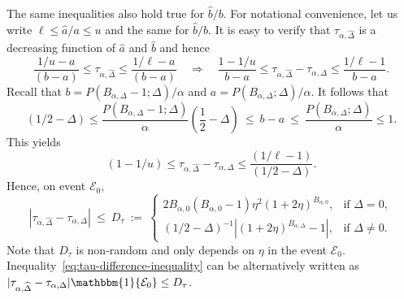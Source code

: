 \documentclass{article}
\numberwithin{myalgctr}{section}
\begin{document}
The same inequalities also hold true for $\widehat{b}/b$. For notational convenience, let us write $\ell \le \widehat{a}/a \le u$ and the same for $\widehat{b}/b$. It is easy to verify that $\tau_{\alpha,\widehat{\Delta}}$ is a decreasing function of $\widehat{a}$ and $\widehat{b}$ and hence
\[
\frac{1/u - a}{(b-a)} \le \tau_{\alpha,\widehat{\Delta}} \le \frac{1/\ell - a}{(b-a)}\quad\Rightarrow\quad \frac{1 - 1/u}{b - a} \le \tau_{\alpha,\widehat{\Delta}} - \tau_{\alpha,\Delta} \le \frac{1/\ell - 1}{b - a}.
\]
Recall that $b = P(B_{\alpha,\Delta} - 1; \Delta)/\alpha$ and $a = P(B_{\alpha,\Delta}; \Delta)/\alpha$. It follows that
\[
\left(1/2 - \Delta\right) \le \frac{P(B_{\alpha,\Delta} - 1; \Delta)}{\alpha}\left(\frac{1}{2} - \Delta\right) ~\le~ b - a ~\le~ \frac{P(B_{\alpha,\Delta}; \Delta)}{\alpha} \le 1.
\]
This yields
\[
(1 - 1/u) \le \tau_{\alpha,\widehat{\Delta}} - \tau_{\alpha,\Delta} \le \frac{(1/\ell - 1)}{(1/2 - \Delta)}.
\]
Hence, on event $\mathcal{E}_0$,
\begin{equation}\label{eq:tau-difference-inequality}
|\tau_{\alpha,\widehat{\Delta}} - \tau_{\alpha,\Delta}| ~\le~ D_{\tau} ~:=~ \begin{cases}2B_{\alpha,0}(B_{\alpha,0} - 1)\eta^2(1 + 2\eta)^{B_{\alpha,0}}, &\mbox{if }\Delta = 0,\\
(1/2 - \Delta)^{-1}|(1 + 2\eta)^{B_{\alpha,\Delta}} - 1|, &\mbox{if }\Delta \neq 0.
\end{cases}
\end{equation}
Note that $D_{\tau}$ is non-random and only depends on $\eta$ in the event $\mathcal{E}_0$. Inequality~\eqref{eq:tau-difference-inequality} can be alternatively written as $|\tau_{\alpha,\widehat{\Delta}} - \tau_{\alpha,\Delta}|\mathbbm{1}\{\mathcal{E}_0\} \le D_{\tau}$.
\end{document}
